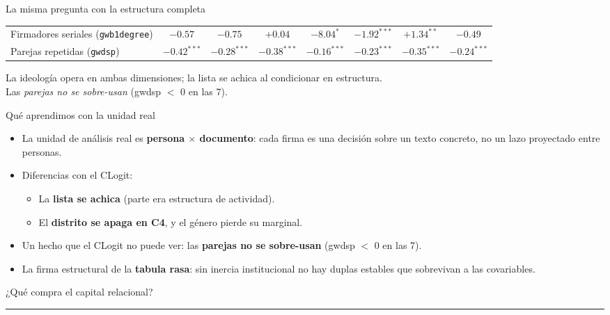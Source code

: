 \documentclass[aspectratio=169,11pt]{beamer}
\newcommand{\emphr}[1]{{\color{ndreddark}\textbf{#1}}}
\newcommand{\nota}[1]{{\footnotesize\color{ndgray} #1}}
\begin{document}
\begin{frame}{La misma pregunta con la estructura completa}
\begin{center}
\begin{tabular}{lccccccc}
Firmadores seriales (\texttt{gwb1degree}) & $-0.57$ & $-0.75$ & $+0.04$ & $-8.04^{*}$ & $-1.92^{***}$ & $+1.34^{**}$ & $-0.49$ \\
Parejas repetidas (\texttt{gwdsp}) & $-0.42^{***}$ & $-0.28^{***}$ & $-0.38^{***}$ & $-0.16^{***}$ & $-0.23^{***}$ & $-0.35^{***}$ & $-0.24^{***}$ \\
\bottomrule
\end{tabular}
\end{center}
\vspace{0.05cm}
\nota{La ideología opera en ambas dimensiones; la lista se achica al condicionar en estructura.} \\
\nota{Las \emph{parejas no se sobre-usan} (gwdsp $<$ 0 en las 7).}
\end{frame}

\begin{frame}{Qué aprendimos con la unidad real}
\begin{itemize}
  \item La unidad de análisis real es \emphr{persona $\times$ documento}: cada firma es una decisión sobre un texto concreto, no un lazo proyectado entre personas.
  \vspace{0.35cm}
  \item Diferencias con el CLogit: 
  \begin{itemize}
    \item La \emphr{lista se achica} (parte era estructura de actividad).
    \item El \emphr{distrito se apaga en C4}, y el género pierde su marginal.
  \end{itemize}
  \vspace{0.35cm}
  \item Un hecho que el CLogit no puede ver: las \emphr{parejas no se sobre-usan} (gwdsp $<$ 0 en las 7).
  \item La firma estructural de la \emphr{tabula rasa}: sin inercia institucional no hay duplas estables que sobrevivan a las covariables.
\end{itemize}
\end{frame}

\begin{frame}[plain]
  \vfill
  \begin{center}
    {\Large ¿Qué compra el capital relacional?}\\[2pt]
    {\color{ndred}\rule{0.30\textwidth}{1.1pt}}
  \end{center}
  \vfill
\end{frame}
\end{document}
